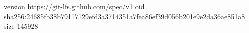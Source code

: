 version https://git-lfs.github.com/spec/v1
oid sha256:24685fb38b79117129efd3a3714351a7fea86ef39d056b201e9e2da36ae851a8
size 145928
